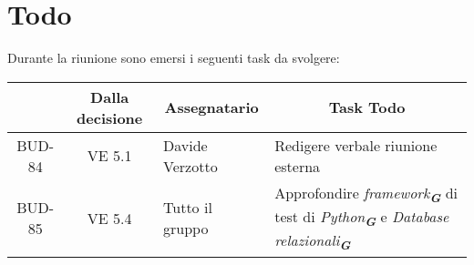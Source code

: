

\section{Todo}

Durante la riunione sono emersi i seguenti task da svolgere:

\vspace{0.5cm}

\begin{table}[htbp]
\centering
{}
\begin{tabular}{|c|c|p{}|p{}|}
    \hline
    \rowcolor[gray]{0.75}
    \multicolumn{1}{|c|}{\textbf{Codice}} & \multicolumn{1}{|c|}{\textbf{Dalla decisione}} & \multicolumn{1}{|c|}{\textbf{Assegnatario}} & \multicolumn{1}{|c|}{\textbf{Task Todo}} \\
    \hline
    BUD-84 & VE 5.1 & Davide Verzotto & Redigere verbale riunione esterna \\
    BUD-85 & VE 5.4 & Tutto il gruppo & Approfondire \emph{framework}\textsubscript{\textbf{\textit{G}}} di test di \emph{Python}\textsubscript{\textbf{\textit{G}}} e \emph{Database relazionali}\textsubscript{\textbf{\textit{G}}}\\
    \hline
\end{tabular}
\end{table}

